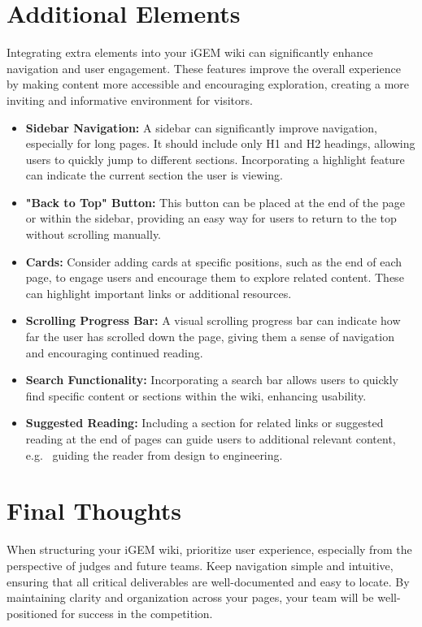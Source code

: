 \section{Additional Elements}
Integrating extra elements into your iGEM wiki can significantly enhance navigation and user engagement.
These features improve the overall experience by making content more accessible and encouraging exploration, creating a more inviting and informative environment for visitors.
\begin{itemize}
    \item \textbf{Sidebar Navigation:}
    A sidebar can significantly improve navigation, especially for long pages.
    It should include only H1 and H2 headings, allowing users to quickly jump to different sections.
    Incorporating a highlight feature can indicate the current section the user is viewing.


    \item \textbf{"Back to Top" Button:}
    This button can be placed at the end of the page or within the sidebar, providing an easy way for users to return to the top without scrolling manually. %

    \item \textbf{Cards:}
    Consider adding cards at specific positions, such as the end of each page, to engage users and encourage them to explore related content.
    These can highlight important links or additional resources.

    \item \textbf{Scrolling Progress Bar:}
    A visual scrolling progress bar can indicate how far the user has scrolled down the page, giving them a sense of navigation and encouraging continued reading.

    \item \textbf{Search Functionality:}
    Incorporating a search bar allows users to quickly find specific content or sections within the wiki, enhancing usability.


    \item \textbf{Suggested Reading:}
    Including a section for related links or suggested reading at the end of pages can guide users to additional relevant content, e.g. \ guiding the reader from design to engineering.
\end{itemize}


\section*{Final Thoughts}
When structuring your iGEM wiki, prioritize user experience, especially from the perspective of judges and future teams.
Keep navigation simple and intuitive, ensuring that all critical deliverables are well-documented and easy to locate.
By maintaining clarity and organization across your pages, your team will be well-positioned for success in the competition.
